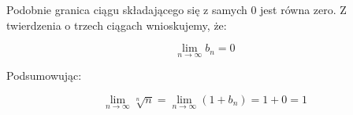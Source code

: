\documentclass[a4paper,oneside,openright,11pt]{article}
\numberwithin{equation}{section}
\begin{document}
Podobnie granica ciągu składającego się z samych $0$ jest równa zero. Z twierdzenia o trzech ciągach wnioskujemy, że:

\begin{equation*}
    \lim_{n\to\infty} b_{n} = 0
\end{equation*}

Podsumowując:

\begin{equation*}
    \lim_{n\to\infty} \sqrt[n]{n} = \lim_{n\to\infty} (1 + b_{n}) = 1 + 0 = 1
\end{equation*}
\end{document}
